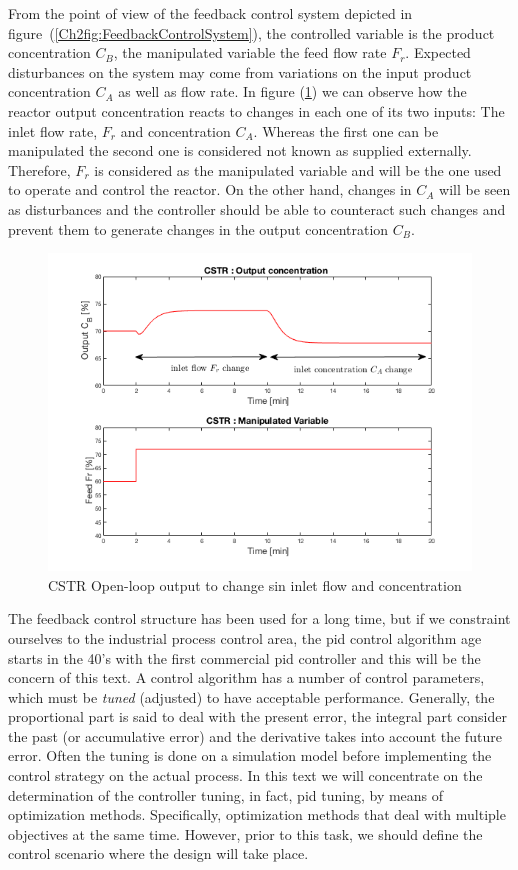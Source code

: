 From the point of view of the feedback control system depicted in figure~(\ref{Ch2fig:FeedbackControlSystem}), the controlled variable is the product concentration $C_B$, the manipulated variable  the feed flow rate $F_r$. Expected disturbances on the system  may come from variations on the input product concentration $C_A$ as well as flow rate. In figure (\ref{Ch2fig:CSTRFigureOpenLoop}) we can observe how the reactor output concentration reacts to changes in each one of its two inputs: The inlet flow rate, $F_r$ and concentration $C_A$. Whereas the first one can be manipulated the second one is considered not known as supplied externally. Therefore, $F_r$ is considered as the manipulated variable and will be the one used to operate and control the reactor. On the other hand, changes in $C_A$ will be seen as disturbances and the controller should be able to counteract such changes and prevent them to generate changes in the output concentration $C_B$. 
%
\begin{figure}[tb]
\centering
\includegraphics[width=\linewidth]{../figuras/Ch2FigureOpenLoop}
\caption{CSTR Open-loop output to change sin inlet flow and concentration} 
\label{Ch2fig:CSTRFigureOpenLoop}
\end{figure}

The feedback control structure has been used for a long time, but if we constraint ourselves to the industrial process control area, the \gls{pid} control algorithm age starts in the 40's  with the first commercial \gls{pid} controller and this will be the concern of this text.  A control algorithm has a number of control parameters, which must be \emph{tuned} (adjusted) to have acceptable performance. Generally, the proportional part is said to deal with the present error, the integral part consider the past (or accumulative error) and the derivative takes into account the future error. Often the tuning is done on a simulation model before implementing the control strategy on the actual process. In this text we will concentrate on the determination of the controller tuning, in fact, \gls{pid} tuning, by means of optimization methods. Specifically, optimization methods that deal with multiple objectives at the same time. However, prior to this task, we should define the control scenario where the design will take place.

